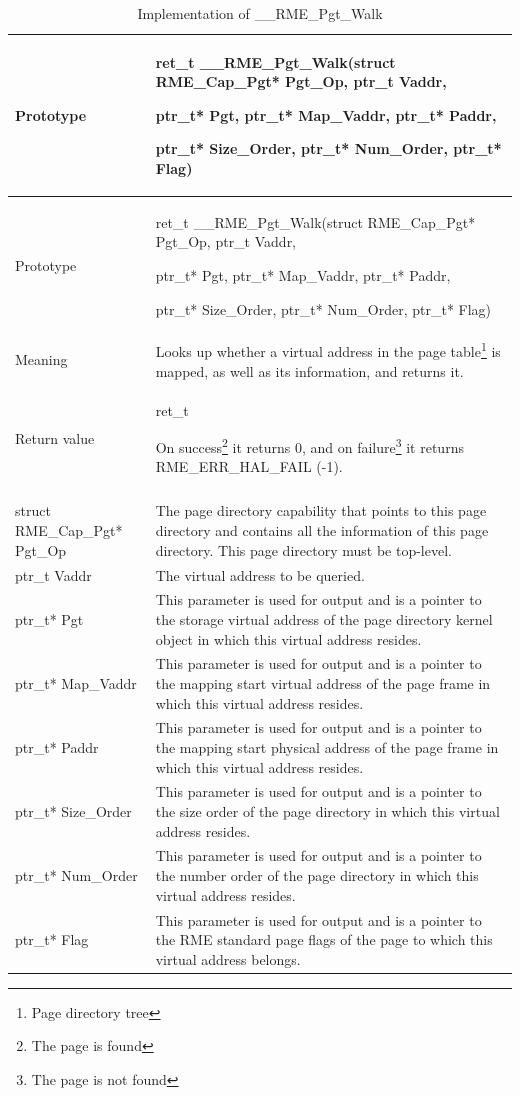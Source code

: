 \begin{xltabular}{\textwidth}{@{}>{\hsize\raggedright\arraybackslash}X>{\hsize\raggedright\arraybackslash}X@{}}
\caption{Implementation of \_\_RME\_Pgt\_Walk}\label{tab:7-84-rme-pgt-walk-implementation}\\
\toprule
Prototype\strut
 & ret\_t \_\_RME\_Pgt\_Walk(struct RME\_Cap\_Pgt* Pgt\_Op, ptr\_t Vaddr,

ptr\_t* Pgt, ptr\_t* Map\_Vaddr, ptr\_t* Paddr,

ptr\_t* Size\_Order, ptr\_t* Num\_Order, ptr\_t* Flag)\strut
\tabularnewline
\endfirsthead
\toprule
Prototype\strut
 & ret\_t \_\_RME\_Pgt\_Walk(struct RME\_Cap\_Pgt* Pgt\_Op, ptr\_t Vaddr,

ptr\_t* Pgt, ptr\_t* Map\_Vaddr, ptr\_t* Paddr,

ptr\_t* Size\_Order, ptr\_t* Num\_Order, ptr\_t* Flag)\strut
\tabularnewline
\midrule
\endhead
\bottomrule
\endlastfoot
Meaning &
Looks up whether a virtual address in the page table\footnote{Page directory tree} is mapped, as well as its information, and returns it.\tabularnewline
Return value\strut
 & ret\_t

On success\footnote{The page is found} it returns 0, and on failure\footnote{The page is not found} it returns RME\_ERR\_HAL\_FAIL (-1).\strut\tabularnewline
{}\tabularnewline
struct RME\_Cap\_Pgt* Pgt\_Op & The page directory capability that points to this page directory and contains all the information of this page directory. This page directory must be top-level.\tabularnewline
ptr\_t Vaddr & The virtual address to be queried.\tabularnewline
ptr\_t* Pgt & This parameter is used for output and is a pointer to the storage virtual address of the page directory kernel object in which this virtual address resides.\tabularnewline
ptr\_t* Map\_Vaddr & This parameter is used for output and is a pointer to the mapping start virtual address of the page frame in which this virtual address resides.\tabularnewline
ptr\_t* Paddr & This parameter is used for output and is a pointer to the mapping start physical address of the page frame in which this virtual address resides.\tabularnewline
ptr\_t* Size\_Order & This parameter is used for output and is a pointer to the size order of the page directory in which this virtual address resides.\tabularnewline
ptr\_t* Num\_Order & This parameter is used for output and is a pointer to the number order of the page directory in which this virtual address resides.\tabularnewline
ptr\_t* Flag & This parameter is used for output and is a pointer to the RME standard page flags of the page to which this virtual address belongs.\tabularnewline
\end{xltabular}
\nopagebreak[4]

